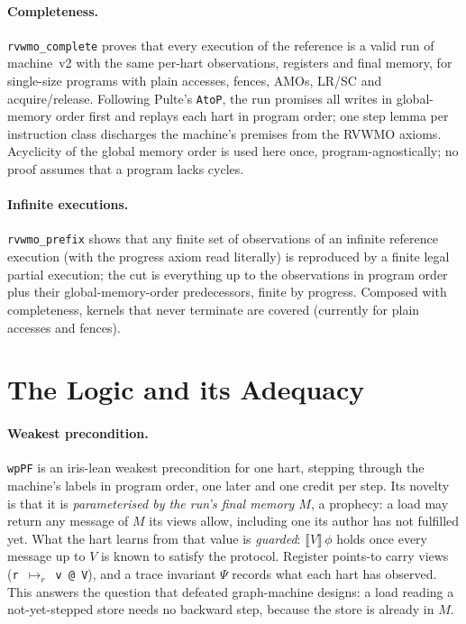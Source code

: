 \documentclass[sigplan,screen,nonacm]{acmart}
\newcommand{\rvwmo}{RVWMO\xspace}
\newcommand{\vtwo}{machine~v2\xspace}
\newcommand{\code}[1]{\texttt{#1}}
\newcommand{\guard}[1]{\llbracket #1 \rrbracket}
\begin{document}
\paragraph{Completeness.}
\code{rvwmo\_complete} proves that every execution of the reference is a valid run of \vtwo with the same per-hart
observations, registers and final memory, for single-size programs with plain accesses, fences, AMOs, LR/SC and
acquire/release. Following Pulte's \code{AtoP}, the run promises all writes in global-memory order first and replays
each hart in program order; one step lemma per instruction class discharges the machine's premises from the \rvwmo
axioms. Acyclicity of the global memory order is used here once, program-agnostically; no proof assumes that a
program lacks cycles.

\paragraph{Infinite executions.}
\code{rvwmo\_prefix} shows that any finite set of observations of an infinite reference execution (with the progress
axiom read literally) is reproduced by a finite legal partial execution; the cut is everything up to the observations
in program order plus their global-memory-order predecessors, finite by progress. Composed with completeness, kernels
that never terminate are covered (currently for plain accesses and fences).

\section{The Logic and its Adequacy}

\paragraph{Weakest precondition.}
\code{wpPF} is an iris-lean weakest precondition for one hart, stepping through the machine's labels in program order,
one later and one credit per step. Its novelty is that it is \emph{parameterised by the run's final memory $M$}, a
prophecy: a load may return any message of $M$ its views allow, including one its author has not fulfilled yet. What
the hart learns from that value is \emph{guarded}: $\guard{V}\,\phi$ holds once every message up to $V$ is known to
satisfy the protocol. Register points-to carry views (\code{r $\mapsto_r$ v @ V}), and a trace invariant $\Psi$
records what each hart has observed. This answers the question that defeated graph-machine designs: a load reading a
not-yet-stepped store needs no backward step, because the store is already in $M$.
\end{document}
